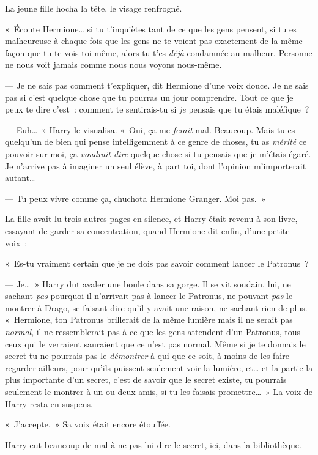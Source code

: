 La jeune fille hocha la tête, le visage renfrogné.

«~Écoute Hermione… si tu t'inquiètes tant de ce que les gens pensent, si tu es malheureuse à chaque fois que les gens ne te voient pas exactement de la même façon que tu te vois toi-même, alors tu t'es \emph{déjà} condamnée au malheur.
Personne ne nous voit jamais comme nous nous voyons nous-même.

--- Je ne sais pas comment t'expliquer, dit Hermione d'une voix douce.
Je ne sais pas si c'est quelque chose que tu pourras un jour comprendre.
Tout ce que je peux te dire c'est~: comment te sentirais-tu si \emph{je} pensais que tu étais maléfique~?

--- Euh…~»
Harry le visualisa.
«~Oui, ça me \emph{ferait} mal.
Beaucoup.
Mais tu es quelqu'un de bien qui pense intelligemment à ce genre de choses, tu as \emph{mérité} ce pouvoir sur moi, ça \emph{voudrait dire} quelque chose si tu pensais que je m'étais égaré.
Je n'arrive pas à imaginer un seul élève, à part toi, dont l'opinion m'importerait autant…

--- Tu peux vivre comme ça, chuchota Hermione Granger.
Moi pas.~»

La fille avait lu trois autres pages en silence, et Harry était revenu à son livre, essayant de garder sa concentration, quand Hermione dit enfin, d'une petite voix~:

«~Es-tu vraiment certain que je ne dois pas savoir comment lancer le Patronus~?

--- Je…~» Harry dut avaler une boule dans sa gorge.
Il se vit soudain, lui, ne sachant \emph{pas} pourquoi il n'arrivait pas à lancer le Patronus, ne pouvant \emph{pas} le montrer à Drago, se faisant dire qu'il y avait une raison, ne sachant rien de plus.
«~Hermione, ton Patronus brillerait de la même lumière mais il ne serait pas \emph{normal}, il ne ressemblerait pas à ce que les gens attendent d'un Patronus, tous ceux qui le verraient sauraient que ce n'est pas normal.
Même si je te donnais le secret tu ne pourrais pas le \emph{démontrer} à qui que ce soit, à moins de les faire regarder ailleurs, pour qu'ils puissent seulement voir la lumière, et… et la partie la plus importante d'un secret, c'est de savoir que le secret existe, tu pourrais seulement le montrer à un ou deux amis, si tu les faisais promettre…~»
La voix de Harry resta en suspens.

«~J'accepte.~»
Sa voix était encore étouffée.

Harry eut beaucoup de mal à ne pas lui dire le secret, ici, dans la bibliothèque.


